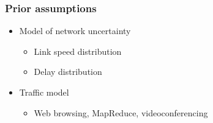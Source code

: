 \documentclass[svgnames]{beamer}
\begin{document}
\begin{frame}
\frametitle{Prior assumptions}

\begin{itemize}

\Large

\item Model of network uncertainty

\begin{itemize}
\item Link speed distribution
\item Delay distribution
\end{itemize}

\item Traffic model

\begin{itemize}
\item Web browsing, MapReduce, videoconferencing
\end{itemize}

\end{itemize}

\end{frame}
\end{document}
